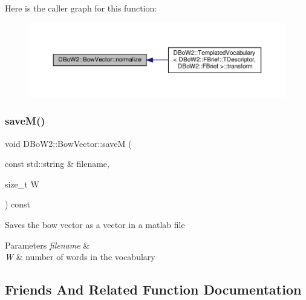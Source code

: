 Here is the caller graph for this function\+:\nopagebreak
\begin{figure}[H]
\begin{center}
\leavevmode
\includegraphics[width=350pt]{classDBoW2_1_1BowVector_acd2dd34023e3053a4cc75d70c8b6ac13_icgraph}
\end{center}
\end{figure}
\mbox{\label{classDBoW2_1_1BowVector_a0611e948f987574161c121231341537b}} 
\subsubsection{\texorpdfstring{save\+M()}{saveM()}}
{\footnotesize\ttfamily void D\+Bo\+W2\+::\+Bow\+Vector\+::saveM (\begin{DoxyParamCaption}\item[{const std\+::string \&}]{filename,  }\item[{size\+\_\+t}]{W }\end{DoxyParamCaption}) const}

Saves the bow vector as a vector in a matlab file 
\begin{DoxyParams}{Parameters}
{\em filename} & \\
\hline
{\em W} & number of words in the vocabulary \\
\hline
\end{DoxyParams}


\subsection{Friends And Related Function Documentation}
\mbox{\label{classDBoW2_1_1BowVector_a1a7d9ac0f9128538859adfea38453ae1}} 
